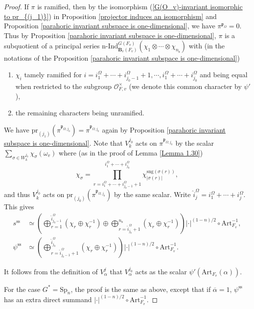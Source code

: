 \documentclass[12pt,oneside,reqno]{amsart}
\theoremstyle{plain}
\begin{document}
\begin{proof}
		
		If $\pi$ is ramified,
		then by the isomorphism (\ref{G(O_v)-invariant isomorphic to pr_{(j_1)}}) in Proposition \ref{projector induces an isomorphism} and Proposition \ref{parahoric invariant subspace is one-dimensional}, we have
		$\pi^{\mathfrak{p}_\Omega}=0$.
		Thus by Proposition \ref{parahoric invariant subspace is one-dimensional},
		$\pi$ is a subquotient of a principal series
		$\mathrm{n}
		\text{-}
		\mathrm{Ind}_{\mathbf{B}_v(F_v)}^{ G(F_v)}
		(\chi_1\otimes\cdots\otimes\chi_{n_\mathrm{s}})$
		with
		(in the notations of the Proposition \ref{parahoric invariant subspace is one-dimensional})
		\begin{enumerate}
			\item 
			$\chi_i$
			tamely ramified for
			$i=i^\Omega_1+\cdots+i^\Omega_{j_0-1}+1,\cdots,
			i^\Omega_1+\cdots+i^\Omega_{j_0}$
			and being equal when restricted to the subgroup
			$\mathcal{O}_{F,v}^\times$ (we denote this common character by $\psi'$),
			
			
			\item 
			the remaining characters being unramified.
		\end{enumerate}		
		We have
		$\mathrm{pr}_{(j_1)}(\pi^{\mathfrak{p}_{\Omega,j_0}})
		=
		\pi^{\mathfrak{p}_{\Omega,j_0}}$ again by Proposition \ref{parahoric invariant subspace is one-dimensional}.
		Note that
		$V_k^{j_0}$
		acts on
		$\pi^{\mathfrak{p}_{\Omega,j_0}}$
		by the scalar
		$\sum_{\sigma\in W_k^{j_0}}\chi_\sigma(\omega_v)$
		where
		(as in the proof of Lemma \ref{Lemma 1.30})
		\[
		\chi_\sigma
		=
		\prod_{
			r=i^\Omega_1+\cdots+i^\Omega_{j_0-1}+1
		}^{
			i^\Omega_1+\cdots+i^\Omega_{j_0}}
		\chi_{|\sigma(r)|}^{\mathrm{sng}(\sigma(r))},
		\]
		and thus
		$V^{j_0}_k$
		acts
		on
		$\mathrm{pr}_{(j_0)}
		(\pi^{\mathfrak{p}_{\Omega,j_0}})$
		by the same scalar.
		Write
		$\widehat{i}^\Omega_j=i^\Omega_1+\cdots+i^\Omega_j$.
		This gives
		\begin{align*}
			s^\mathrm{ss}
			&
			\simeq
			\left(
			\bigoplus_{r=1}^{\widehat{i}^\Omega_{j_0-1}}(\chi_r\oplus\chi_r^{-1})
			\oplus
			\bigoplus_{r=\widehat{i}^\Omega_{j_0}+1}^{n_\mathrm{s}}
			(\chi_r\oplus\chi_r^{-1})
			\right)
			|\cdot|^{(1-n)/2}
			\circ
			\mathrm{Art}_{F_v}^{-1},
			\\
			\psi^\mathrm{ss}
			&
			\simeq
			\left(
			\bigoplus_{r=\widehat{i}^\Omega_{j_0-1}+1}^{\widehat{i}^\Omega_{j_0}}
			(\chi_r\oplus\chi_r^{-1})
			\right)
			|\cdot|^{(1-n)/2}
			\circ
			\mathrm{Art}_{F_v}^{-1}.
		\end{align*}
		
		
		
		It follows from the definition of
		$V^j_\alpha$
		that
		$V^{j_0}_\alpha$
		acts as
		the scalar
		$\psi'(\mathrm{Art}_{F_v}(\alpha))$.
		
		
		
		For the case $G^\ast=\mathrm{Sp}_n$, the proof is the same as above, except that if $\overline{\alpha}=1$, $\psi^\mathrm{ss}$ has an extra direct summand $|\cdot|^{(1-n)/2}\circ\mathrm{Art}_{F_v}^{-1}$.
	\end{proof}
	
\end{document}
